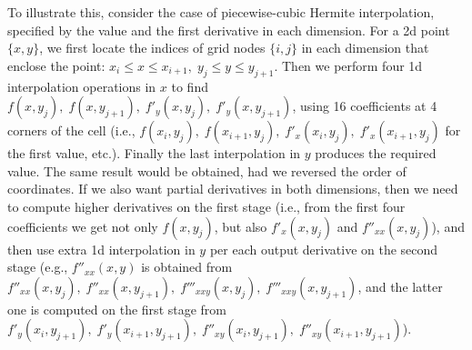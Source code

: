 \documentclass[12pt]{article}
\begin{document}
To illustrate this, consider the case of piecewise-cubic Hermite interpolation, specified by the value and the first derivative in each dimension. For a 2d point $\{x,y\}$, we first locate the indices of grid nodes $\{i,j\}$ in each dimension that enclose the point: $x_i\le x \le x_{i+1},\; y_j\le y \le y_{j+1}$. Then we perform four 1d interpolation operations in $x$ to find $f(x, y_j),\; f(x, y_{j+1}),\; f'_y(x, y_j),\; f'_y(x, y_{j+1})$, using 16 coefficients at 4 corners of the cell (i.e., $f(x_i,y_j),\; f(x_{i+1},y_j),\; f'_x(x_i,y_j),\; f'_x(x_{i+1},y_j)$ for the first value, etc.). Finally the last interpolation in $y$ produces the required value. The same result would be obtained, had we reversed the order of coordinates. 
If we also want partial derivatives in both dimensions, then we need to compute higher derivatives on the first stage (i.e., from the first four coefficients we get not only $f(x, y_j)$, but also $f'_x(x, y_j)$ and $f''_{xx}(x, y_j)$), and then use extra 1d interpolation in $y$ per each output derivative on the second stage (e.g., $f''_{xx}(x, y)$ is obtained from $f''_{xx}(x, y_j),\; f''_{xx}(x, y_{j+1}),\; f'''_{xxy}(x, y_j),\; f'''_{xxy}(x, y_{j+1})$, and the latter one is computed on the first stage from $f'_y(x_i, y_{j+1}),\; f'_y(x_{i+1}, y_{j+1}),\; f''_{xy}(x_i, y_{j+1}),\; f''_{xy}(x_{i+1}, y_{j+1})$). 
\end{document}
